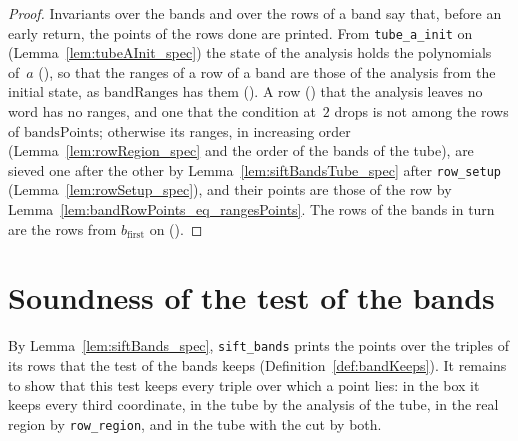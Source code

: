 \begin{proof}
  \leanok
  Invariants over the bands and over the rows of a band say that, before an early return, the
  points of the rows done are printed. From \texttt{tube\_a\_init} on (Lemma~\ref{lem:tubeAInit_spec})
  the state of the analysis holds the polynomials of~$a$ (), so
  that the ranges of a row of a band are those of the analysis from the initial state, as
  $\mathrm{bandRanges}$ has them (). A row
  () that the analysis leaves no word has no ranges, and one that
  the condition at~$2$ drops is not among the rows of $\mathrm{bandsPoints}$; otherwise its ranges,
  in increasing order (Lemma~\ref{lem:rowRegion_spec} and the order of the bands of the tube), are
  sieved one after the other by Lemma~\ref{lem:siftBandsTube_spec} after \texttt{row\_setup}
  (Lemma~\ref{lem:rowSetup_spec}), and their points are those of the row by
  Lemma~\ref{lem:bandRowPoints_eq_rangesPoints}. The rows of the bands in turn are the rows from
  $b_{\mathrm{first}}$ on ().
\end{proof}

\section{Soundness of the test of the bands}\label{sec:bandsSound}

By Lemma~\ref{lem:siftBands_spec}, \texttt{sift\_bands} prints the points over the triples of its
rows that the test of the bands keeps (Definition~\ref{def:bandKeeps}). It remains to show that
this test keeps every triple over which a point lies: in the box it keeps every third coordinate,
in the tube by the analysis of the tube, in the real region by \texttt{row\_region}, and in the
tube with the cut by both.

